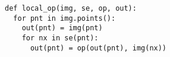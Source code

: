 \documentclass[varwidth=8cm, border={0.1cm 0.1cm 0.1cm 0.1cm}]{standalone}
\begin{document}
\begin{verbatim}
def local_op(img, se, op, out):
  for pnt in img.points():
    out(pnt) = img(pnt)
    for nx in se(pnt):
      out(pnt) = op(out(pnt), img(nx))
\end{verbatim}
\end{document}
